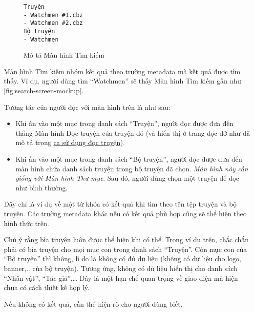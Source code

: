 \documentclass[../../thesis]{subfiles}
\begin{document}
\begin{wrapfigure}[8]{r}{4.5cm}
\vspace*{-10mm}
\begin{verbatim}
Truyện
- Watchmen #1.cbz
- Watchmen #2.cbz
Bộ truyện
- Watchmen
\end{verbatim}
\caption{Mô tả Màn hình Tìm kiếm}
\label{fig:search-screen-mockup}
\end{wrapfigure}

Màn hình Tìm kiếm nhóm kết quả theo trường metadata mà kết quả được tìm thấy. Ví
dụ, người dùng tìm ``Watchmen'' sẽ thấy Màn hình Tìm kiếm gần như
\autoref{fig:search-screen-mockup}.

Tương tác của người đọc với màn hình trên là như sau:

\begin{itemize}
    \item
        Khi ấn vào một mục trong danh sách ``Truyện'', người đọc được đưa đến
        thẳng Màn hình Đọc truyện của truyện đó (và hiển thị ở trang đọc dở như
        đã mô tả trong \hyperref[sec:read-comic]{ca sử dụng đọc truyện}).
\end{itemize}

\begin{itemize}[resume, before = \vspace*{-\dimexpr\topsep+\partopsep\relax}]
    \item
        Khi ấn vào một mục trong danh sách ``Bộ truyện'', người đọc được đưa đến
        màn hình chứa danh sách truyện trong bộ truyện đã chọn. \emph{Màn hình
        này cần giống với Màn hình Thư mục}. Sau đó, người dùng chọn một truyện
        để đọc như bình thường.
\end{itemize}

Đây chỉ là ví dụ về một từ khóa có kết quả khi tìm theo tên tệp truyện và bộ
truyện. Các trường metadata khác nếu có kết quả phù hợp cũng sẽ thể hiện theo
hình thức trên.

Chú ý rằng bìa truyện luôn được thể hiện khi có thể. Trong ví dụ trên, chắc chắn
phải có bìa truyện cho mọi mục con trong danh sách ``Truyện''. Còn mục con của
``Bộ truyện'' thì không, lí do là không có đủ dữ liệu (không có dữ liệu cho
logo, banner,.. của bộ truyện). Tương ứng, không có dữ liệu hiển thị cho danh
sách ``Nhân vật'', ``Tác giả'',\ldots{} Đây là một hạn chế quan trọng về giao
diện mà hiện chưa có cách thiết kế hợp lý.

Nếu không có kết quả, cần thể hiện rõ cho người dùng biết.
\end{document}

